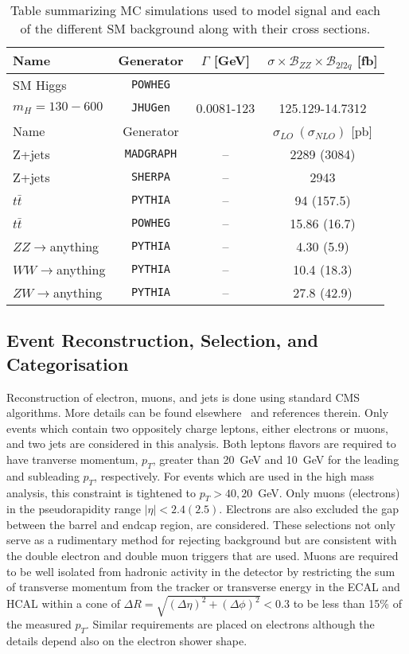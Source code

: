 \begin{table}
\begin{center}
\begin{tabular}{l|c|c|c}
\hline 
\hline
Name & Generator & $\Gamma$ [GeV] & $\sigma\times\mathscr{B}_{ZZ}\times\mathscr{B}_{2l2q}$ [fb] \\
\hline
SM Higgs  & \verb+POWHEG+ & & \\
$m_H=130-600$ & \verb+JHUGen+ & 0.0081-123 & 125.129-14.7312 \\ 
\hline \hline
Name & Generator &  & $\sigma_{LO}~(\sigma_{NLO})$ [pb] \\ \hline \hline
Z+jets    & \verb+MADGRAPH+ & -- & 2289 (3084) \\
Z+jets    & \verb+SHERPA+  & -- & 2943        \\
$t\bar{t}$& \verb+PYTHIA+   & -- & 94 (157.5)  \\
$t\bar{t}$& \verb+POWHEG+   & -- & 15.86 (16.7)\\
$ZZ\to$anything & \verb+PYTHIA+ & -- & 4.30 (5.9) \\ 
$WW\to$anything & \verb+PYTHIA+ & -- & 10.4 (18.3) \\ 
$ZW\to$anything & \verb+PYTHIA+ & -- & 27.8 (42.9) \\ 
\hline\hline
\end{tabular}
\caption{Table summarizing MC simulations used to model signal
  and each of the different SM background along with their 
cross sections.}
\label{table:HZZ2l2qMCsamples}
\end{center}
\end{table}

\subsection{Event Reconstruction, Selection, and Categorisation}
\label{sec:HZZ2l2qselection}

Reconstruction of electron, muons, and jets is done using
standard CMS algorithms.  More details can be found elsewhere~\cite{Chatrchyan:2012sn} and references therein.  Only events which contain
two oppositely charge leptons, either electrons or
muons, and two jets are considered in this analysis.  Both leptons
flavors are required to have tranverse momentum, $p_T$, greater
than 20~GeV
and 10~GeV for the leading and subleading $p_T$, respectively.  For events 
which are used in the high mass analysis, this constraint is tightened to 
$p_T>40, 20$~GeV.  Only muons (electrons) in the pseudorapidity range 
$|\eta|<2.4 (2.5)$.  Electrons are also excluded the gap between the barrel and endcap region, 
are considered.  These selections not only serve as a rudimentary method for
rejecting background but are consistent with the double electron and 
double muon triggers that are used.  Muons are required to be well 
isolated from hadronic activity in the detector by restricting the sum of
transverse momentum from the tracker or transverse energy in the ECAL and
HCAL within a cone of $\Delta R  = \sqrt{(\Delta\eta)^2+(\Delta\phi)^2}<0.3$
to be less than 15\% of the measured $p_T$.  Similar requirements are placed
on electrons although the details depend also on the electron shower shape.


